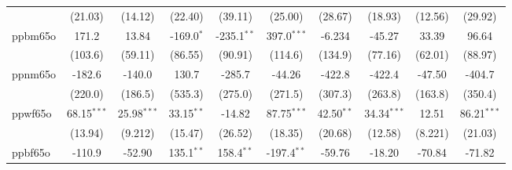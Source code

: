 \begin{table}[htbp]
\begin{tabular}{lccccccccc}
                                     & (21.03)                      & (14.12)                       & (22.40)                     & (39.11)                   & (25.00)                       & (28.67)                      & (18.93)                       & (12.56)                      & (29.92)\\   
      ppbm65o                        & 171.2                        & 13.84                         & -169.0$^{*}$                & -235.1$^{**}$             & 397.0$^{***}$                 & -6.234                       & -45.27                        & 33.39                        & 96.64\\   
                                     & (103.6)                      & (59.11)                       & (86.55)                     & (90.91)                   & (114.6)                       & (134.9)                      & (77.16)                       & (62.01)                      & (88.97)\\   
      ppnm65o                        & -182.6                       & -140.0                        & 130.7                       & -285.7                    & -44.26                        & -422.8                       & -422.4                        & -47.50                       & -404.7\\   
                                     & (220.0)                      & (186.5)                       & (535.3)                     & (275.0)                   & (271.5)                       & (307.3)                      & (263.8)                       & (163.8)                      & (350.4)\\   
      ppwf65o                        & 68.15$^{***}$                & 25.98$^{***}$                 & 33.15$^{**}$                & -14.82                    & 87.75$^{***}$                 & 42.50$^{**}$                 & 34.34$^{***}$                 & 12.51                        & 86.21$^{***}$\\   
                                     & (13.94)                      & (9.212)                       & (15.47)                     & (26.52)                   & (18.35)                       & (20.68)                      & (12.58)                       & (8.221)                      & (21.03)\\   
      ppbf65o                        & -110.9                       & -52.90                        & 135.1$^{**}$                & 158.4$^{**}$              & -197.4$^{**}$                 & -59.76                       & -18.20                        & -70.84                       & -71.82\\   

\end{tabular}
\end{table}
